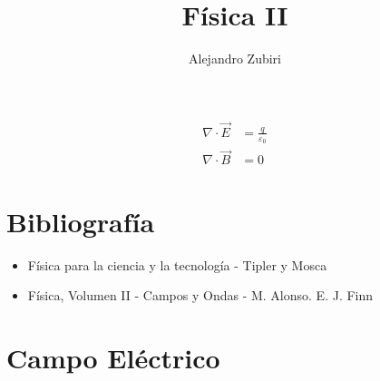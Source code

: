 \documentclass{article}
\author{Alejandro Zubiri}
\title{Física II}
\begin{document}
\maketitle
\begin{equation}
	\begin{split}
		\nabla \cdot \vec{E} &= \frac{q}{\varepsilon_{0}}\\
		\nabla \cdot \vec{B} &= 0
	\end{split}
\end{equation}
\pagebreak
\tableofcontents
\pagebreak
\section{Bibliografía}
\begin{itemize}
	\item Física para la ciencia y la tecnología - Tipler y Mosca
	\item Física, Volumen II - Campos y Ondas - M. Alonso. E. J. Finn
\end{itemize}
\section{Campo Eléctrico}

\end{document}

